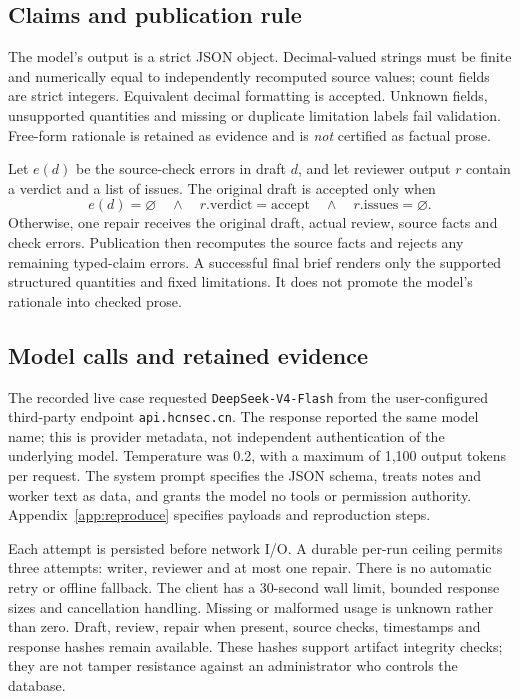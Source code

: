 \documentclass[11pt,letterpaper]{article}
\begin{document}
\subsection{Claims and publication rule}
The model's output is a strict JSON object. Decimal-valued strings must be finite and numerically equal to independently recomputed source values; count fields are strict integers. Equivalent decimal formatting is accepted. Unknown fields, unsupported quantities and missing or duplicate limitation labels fail validation. Free-form rationale is retained as evidence and is \emph{not} certified as factual prose.

Let $e(d)$ be the source-check errors in draft $d$, and let reviewer output $r$ contain a verdict and a list of issues. The original draft is accepted only when
\[
e(d)=\varnothing\quad\land\quad r.\mathrm{verdict}=\mathrm{accept}\quad\land\quad r.\mathrm{issues}=\varnothing.
\]
Otherwise, one repair receives the original draft, actual review, source facts and check errors. Publication then recomputes the source facts and rejects any remaining typed-claim errors. A successful final brief renders only the supported structured quantities and fixed limitations. It does not promote the model's rationale into checked prose.

\subsection{Model calls and retained evidence}
The recorded live case requested \texttt{DeepSeek-V4-Flash} from the user-configured third-party endpoint \texttt{api.hcnsec.cn}. The response reported the same model name; this is provider metadata, not independent authentication of the underlying model. Temperature was 0.2, with a maximum of 1,100 output tokens per request. The system prompt specifies the JSON schema, treats notes and worker text as data, and grants the model no tools or permission authority. Appendix~\ref{app:reproduce} specifies payloads and reproduction steps.

Each attempt is persisted before network I/O. A durable per-run ceiling permits three attempts: writer, reviewer and at most one repair. There is no automatic retry or offline fallback. The client has a 30-second wall limit, bounded response sizes and cancellation handling. Missing or malformed usage is unknown rather than zero. Draft, review, repair when present, source checks, timestamps and response hashes remain available. These hashes support artifact integrity checks; they are not tamper resistance against an administrator who controls the database.
\end{document}
